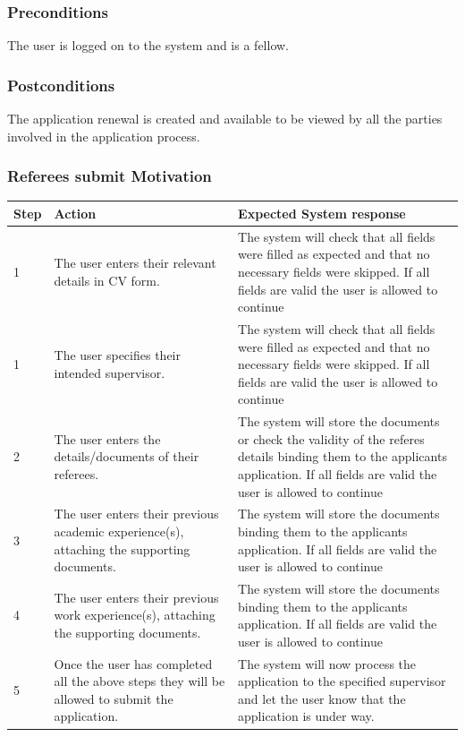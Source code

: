 \documentclass[12pt]{article}
\begin{document}
\subsubsection*{Preconditions}
The user is logged on to the system and is a fellow.

\subsubsection*{Postconditions}
The application renewal is created and available to be viewed by all the parties involved in the application process.

\subsubsection{Referees submit Motivation}

\begin{center}
\begin{tabular}{|l|p{6cm}|p{8cm}|}
\hline
Step & Action & Expected System response \\
\hline
1 & The user enters their relevant details in CV form.  & The system will check that all fields were filled as expected and that no necessary fields were skipped. If all fields are valid the user is allowed to continue \\
\hline
1 & The user specifies their intended supervisor.  & The system will check that all fields were filled as expected and that no necessary fields were skipped. If all fields are valid the user is allowed to continue \\
\hline
2 & The user enters the details/documents of their referees.  & The system will store the documents or check the validity of the referes details binding them to the applicants application. If all fields are valid the user is allowed to continue \\
\hline
3 & The user enters their previous academic experience(s), attaching the supporting documents.  & The system will store the documents binding them to the applicants application. If all fields are valid the user is allowed to continue \\
\hline
4 & The user enters their previous work experience(s), attaching the supporting documents.  & The system will store the documents binding them to the applicants application. If all fields are valid the user is allowed to continue \\
5 & Once the user has completed all the above steps they will be allowed to submit the application.  & The system will now process the application to the specified supervisor and let the user know that the application is under way. \\
\hline
\end{tabular}
\end{center}
\end{document}
